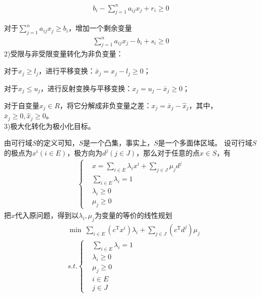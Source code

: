     \begin{align*}
    b_i - \mathop {\sum}\limits_{j=1}^n a_{ij}x_j + r_i\geqslant 0
    \end{align*}
    \par
    对于$\sum\limits_{j=1}^n a_{ij}x_j \geqslant b_i$，增加一个剩余变量
    \begin{align*}
    \sum_{j=1}^n a_{ij}x_j - b_i+s_i \geqslant 0
    \end{align*}
    2)受限与非受限变量转化为非负变量：\par
    对于$x_j \geqslant l_j$，进行平移变换：${\bar{x}}_j = x_j-l_j \geqslant 0$；\par
    对于$x_j \leqslant u_j$，进行反射变换与平移变换：$x_j=u_j-{\bar{x}}_j \geqslant 0$；\par
    对于自变量$x_j \in R$，将它分解成非负变量之差：$x_j={\bar{x}}_j-{\hat{x}}_j$，其中，${\bar{x}}_j \geqslant 0,{\hat{x}}_j \geqslant 0$。\\
    3)极大化转化为极小化目标。\par
    由可行域$S$的定义可知，$S$是一个凸集，事实上，$S$是一个多面体区域。
    设可行域$S$的极点为$x^{i}(i \in E)$，极方向为$d^{j}(j \in J)$，那么对于任意的点$x \in S$，有
    \begin{align*}
    \left\{
    \begin{aligned}
    &x=\mathop{\sum}\limits_{i\in E}{\lambda}_ix^i+\mathop{\sum}\limits_{j\in J}{\mu}_jd^j\\
    &\mathop{\sum}\limits_{i\in E}{\lambda}_i=1\\
    &{\lambda}_i \geqslant 0\\
    &{\mu}_j \geqslant 0
    \end{aligned}
    \right.
    \end{align*}
    把$x$代入原问题，得到以${\lambda}_i,{\mu}_j$为变量的等价的线性规划
    \begin{align*}
    &\min\  \mathop {\sum}\limits_{i\in E}(c^\mathrm{T} x^i){\lambda}_i+\mathop{\sum}\limits_{j\in J}(c^\mathrm{T} d^j){\mu}_j\\
    &s.t.\left\{
    \begin{aligned}
    &\mathop{\sum}\limits_{i\in E}{\lambda}_i=1\\
    &{\lambda}_i \geqslant 0\\
    &{\mu}_j \geqslant 0\\
    &i \in E\\
    &j \in J
    \end{aligned}
    \right.
    \end{align*}
